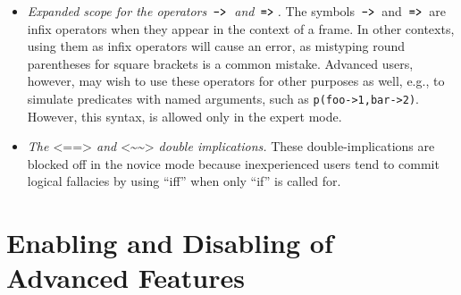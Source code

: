 \documentclass[11pt]{article}
\newcommand{\mvd}{{\mbox{\tt \,->\,}}}  %
\newcommand{\Mvd}{{\mbox{\tt \,=>\,}}}  %
\newcommand{\rlnafarr}{\texttt{<\textasciitilde\textasciitilde>}}
\newcommand{\rlnegarr}{\texttt{<==>}}
\begin{document}
\begin{itemize}
   One reason why embedded ISA-literals in rule heads
   are not advisable to novice users is because a novice tends to confuse
   such literals
   with typed variables. Note that
\begin{verbatim}
    p(?X:foo) :- ...
    p(?X^^foo) :- ...
\end{verbatim}
   are very different things and using the first form is frequently a mistake.
   An embedded ISA-literal, \texttt{p(?X:foo)},
   represents the conjunction \texttt{p(?X), ?X:foo}, so
   the first rule above is equivalent to
\begin{verbatim}
    p(?X), ?X:foo :- ...
\end{verbatim}
   That is, \texttt{?X:foo} is \emph{derived}, not checked.
   Inexperienced users tend to incorrectly assume the latter.
   On the other hand, the second rule, one
   that uses typed variables is equivalent to
\begin{verbatim}
    p(?X) :- ?X:foo, ...
\end{verbatim}
   but using \texttt{?X$\hat{~}\hat{~}$foo} can be much
   more efficient, since the actual tests for class membership are done only
   when the variable gets bound. 
\item  \emph{Expanded scope for the operators $\mvd$ and $\Mvd$.}
  The symbols $\mvd$ and $\Mvd$ are infix operators when they appear in the
  context of a frame.  In other contexts, using them as infix operators
  will cause an error, as mistyping round parentheses for square brackets
  is a common mistake. Advanced users, however, may wish to use these
  operators for other purposes as well, e.g., to simulate predicates with
  named arguments, such as \texttt{p(foo->1,bar->2)}. 
  However, this syntax, is allowed only in the expert mode.
  \index{$\rlnegarr$}
  \index{$\rlnafarr$}
\item \emph{The $\rlnegarr$ and $\rlnafarr$ double implications.}  
  These double-implications are blocked off in the novice mode because
  inexperienced users tend to commit logical fallacies by using ``iff'' when only
  ``if'' is called for.
\end{itemize}

\section{Enabling and Disabling of  Advanced Features}\label{sec=disablefeature}
\end{document}
